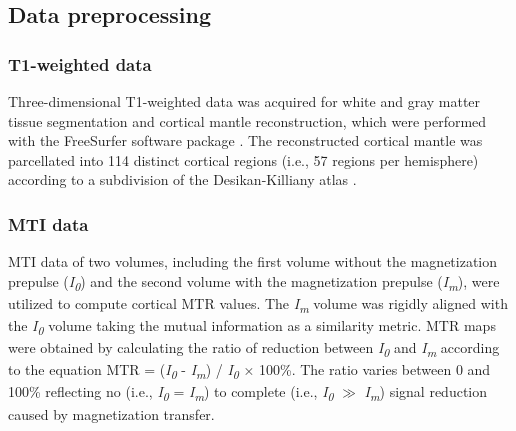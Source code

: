 \begin{refsection}
\subsection*{Data preprocessing}
\subsubsection*{T1-weighted data}
Three-dimensional T1-weighted data was acquired for white and gray matter tissue segmentation and cortical mantle reconstruction, which were performed with the FreeSurfer software package \citep{FISCHL2012Freesurfer}. The reconstructed cortical mantle was parcellated into 114 distinct cortical regions (i.e., 57 regions per hemisphere) according to a subdivision of the Desikan-Killiany atlas \citep{Fischl2004parcellation,CAMMOUN2012386,DESIKAN2006968}.

\subsubsection*{MTI data}
MTI data of two volumes, including the first volume without the magnetization prepulse (\textit{I\textsubscript{0}}) and the second volume with the magnetization prepulse (\textit{I\textsubscript{m}}), were utilized to compute cortical MTR values. The \textit{I\textsubscript{m}} volume was rigidly aligned with the \textit{I\textsubscript{0}} volume taking the mutual information as a similarity metric. MTR maps were obtained by calculating the ratio of reduction between \textit{I\textsubscript{0}} and \textit{I\textsubscript{m}} according to the equation MTR = (\textit{I\textsubscript{0}} - \textit{I\textsubscript{m}}) / \textit{I\textsubscript{0}} × 100\%. The ratio varies between 0 and 100\% reflecting no (i.e., \textit{I\textsubscript{0}} = \textit{I\textsubscript{m}}) to complete (i.e., \textit{I\textsubscript{0}} $\gg$ \textit{I\textsubscript{m}}) signal reduction caused by magnetization transfer.


\end{refsection}
